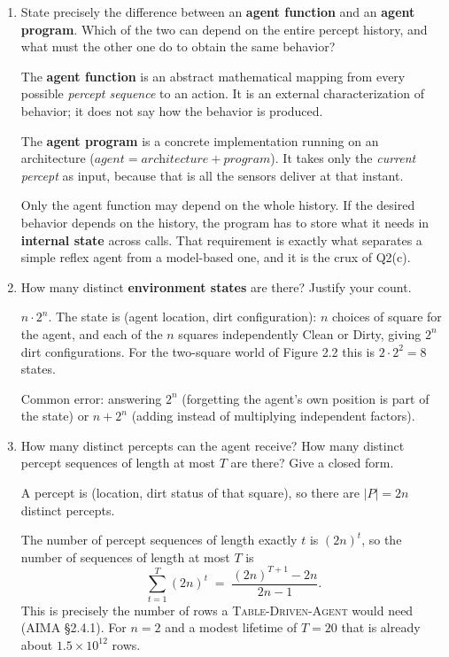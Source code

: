 \begin{enumerate}
\item State precisely the difference between an \textbf{agent function} and an
\textbf{agent program}. Which of the two can depend on the entire percept history, and what
must the other one do to obtain the same behavior?
\ansspace{4.0cm}
\begin{sol}
The \textbf{agent function} is an abstract mathematical mapping from every possible
\emph{percept sequence} to an action. It is an external characterization of behavior; it does
not say how the behavior is produced.

The \textbf{agent program} is a concrete implementation running on an architecture
($\textit{agent} = \textit{architecture} + \textit{program}$). It takes only the
\emph{current percept} as input, because that is all the sensors deliver at that instant.

Only the agent function may depend on the whole history. If the desired behavior depends on
the history, the program has to store what it needs in \textbf{internal state} across calls.
That requirement is exactly what separates a simple reflex agent from a model-based one, and
it is the crux of Q2(c).
\end{sol}

\item How many distinct \textbf{environment states} are there? Justify your count.
\ansspace{2.5cm}
\begin{sol}
$n \cdot 2^{n}$. The state is (agent location, dirt configuration): $n$ choices of square for
the agent, and each of the $n$ squares independently Clean or Dirty, giving $2^{n}$ dirt
configurations. For the two-square world of Figure 2.2 this is $2 \cdot 2^{2} = 8$ states.

Common error: answering $2^{n}$ (forgetting the agent's own position is part of the state) or
$n + 2^n$ (adding instead of multiplying independent factors).
\end{sol}

\item How many distinct percepts can the agent receive? How many distinct percept sequences of
length at most $T$ are there? Give a closed form.
\ansspace{3.0cm}
\begin{sol}
A percept is (location, dirt status of that square), so there are $|P| = 2n$ distinct percepts.

The number of percept sequences of length exactly $t$ is $(2n)^{t}$, so the number of sequences
of length at most $T$ is
\[
\sum_{t=1}^{T} (2n)^{t} \;=\; \frac{(2n)^{T+1} - 2n}{2n - 1}.
\]
This is precisely the number of rows a \textsc{Table-Driven-Agent} would need
(AIMA \S 2.4.1). For $n = 2$ and a modest lifetime of $T = 20$ that is already about
$1.5 \times 10^{12}$ rows.
\end{sol}


\end{enumerate}
